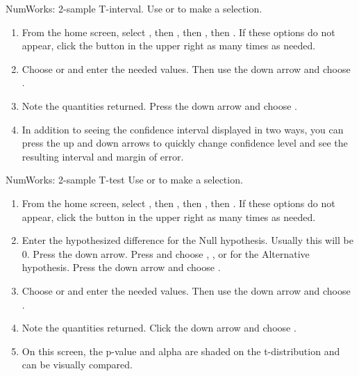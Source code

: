\begin{onebox}{NumWorks: 2-sample T-interval.}
Use  or  to make a selection.
\begin{enumerate}
\setlength{\itemsep}{0mm}
\item From the home screen, select , then , then , then .  If these options do not appear, click the \calcbutton{$\lhookleftarrow$} button in the upper right as many times as needed. 
\item Choose  or  and enter the needed values.  Then use the down arrow and choose .
\item Note the quantities returned.  Press the down arrow and choose .
\item In addition to seeing the confidence interval displayed in two ways, you can press the up and down arrows to quickly change confidence level and see the resulting interval and margin of error.
\begin{center}
\hspace{10mm}
\end{center}
\vspace{-1.5mm}
\end{enumerate}
\end{onebox}
%
\begin{onebox}{NumWorks: 2-sample T-test}
\label{normalnumworks}
Use  or  to make a selection.
\begin{enumerate}
\setlength{\itemsep}{0mm}
\item From the home screen, select , then , then , then .  If these options do not appear, click the \calcbutton{$\lhookleftarrow$} button in the upper right as many times as needed. 
\item Enter the hypothesized difference for the Null hypothesis.  Usually this will be 0.  Press the down arrow.  Press  and choose \calctext{$<$}, \calctext{$\ne$} , or \calctext{$>$}  for the Alternative hypothesis.  Press the down arrow and choose . 
\item Choose  or  and enter the needed values.  Then use the down arrow and choose .
\item Note the quantities returned.  Click the down arrow and choose .
\item On this screen, the p-value and alpha are shaded on the t-distribution and can be visually compared.
\begin{center}
\hspace{10mm}
\end{center}
\vspace{-1.5mm}
\end{enumerate}
\end{onebox}


